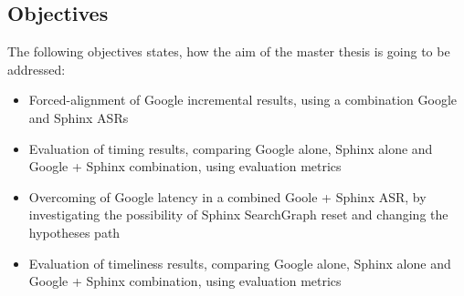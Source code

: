 \subsection {Objectives}
The following objectives states, how the aim of the master thesis is going to be
addressed:
 \begin  {itemize}
   \item Forced-alignment of Google incremental results, using a
   combination Google and Sphinx ASRs
   \item Evaluation of timing results, comparing Google alone, Sphinx alone and
   Google + Sphinx combination, using evaluation metrics
   \item Overcoming of Google latency in a combined Goole + Sphinx ASR, by
   investigating the possibility of Sphinx SearchGraph reset and changing the
   hypotheses path 
   \item Evaluation of timeliness results, comparing Google alone, Sphinx alone
   and Google + Sphinx combination, using evaluation metrics
 \end {itemize}

